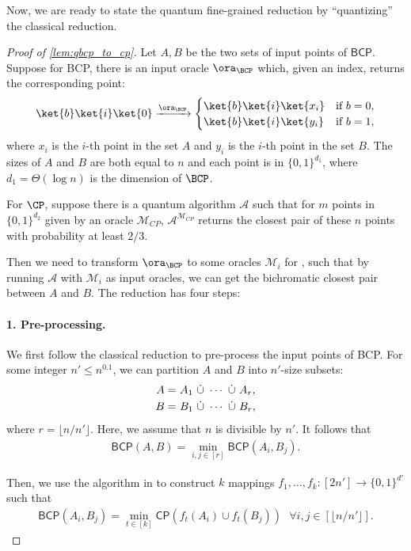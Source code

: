Now, we are ready to state the quantum fine-grained reduction by ``quantizing'' the classical reduction.
\begin{proof}[Proof of \cref{lem:qbcp_to_cp}]
Let $A,B$ be the two sets of input points of $\textsf{BCP}$. Suppose for \textsf{BCP}, there is an input oracle $\ora_{\BCP}$ which, given an index, returns the corresponding point:
\begin{align}
    \ket{b}\ket{i}\ket{0} \xrightarrow{\ora_{\BCP}}
    \begin{cases}
        \ket{b}\ket{i}\ket{x_i} &\text{if } b= 0,\\
        \ket{b}\ket{i}\ket{y_i} & \text{if } b= 1,
    \end{cases}
\end{align}
where $x_i$ is the $i$-th point in the set $A$ and $y_i$ is the $i$-th point in the set $B$. The sizes of $A$ and $B$ are both equal to $n$ and each point is in $\{0,1\}^{d_1}$, where $d_1=\Theta(\log n)$ is the dimension of $\BCP$. 
 
For $\CP$, suppose there is a quantum algorithm $\mathcal{A}$ such that for $m$ points in $\{0,1\}^{d_2}$ given by an oracle $\mathcal{M}_{CP}$, $\mathcal{A}^{\mathcal{M}_{CP}}$ returns the closest pair of these $n$ points with probability at least $2/3$.

Then we need to transform $\ora_{\BCP}$ to some oracles $\mathcal{M}_i$ for \CP, such that by running $\mathcal{A}$ with $\mathcal{M}_i$ as input oracles, we can get the bichromatic closest pair between $A$ and $B$. The reduction has four steps:

\paragraph*{1. Pre-processing.} We first follow the classical reduction to pre-process the input points of \textsf{BCP}. For some integer $n'\leq n^{0.1}$, we can partition $A$ and $B$ into $n'$-size subsets:
\begin{align}
    A= &~ A_1~\dot\cup ~\cdots ~\dot \cup~ A_{r},\\
    B= &~ B_1 ~\dot\cup ~\cdots ~\dot \cup~ B_{r},\notag
\end{align}
where $r=\lfloor n/n'\rfloor$. Here, we assume that $n$ is divisible by $n'$. It follows that
\begin{align}\label{eq:bcp_bcp}
    \textsf{BCP}(A,B)=\min_{i,j\in [r]} \textsf{BCP}(A_i,B_j).
\end{align}

Then, we use the algorithm in \cite{r29} to construct $k$ mappings $f_1,\dots, f_k:[2n']\rightarrow \{0,1\}^{d'}$ such that 
\begin{align}\label{eq:bcp_cp}
    \textsf{BCP}(A_i,B_j)=\min_{t\in [k]} \textsf{CP}(f_t(A_i)\cup f_t(B_j)) ~~~ \forall i,j\in [\lfloor n/n'\rfloor].
\end{align}


\end{proof}
